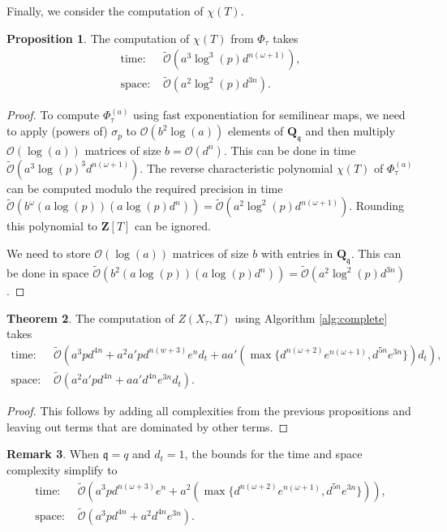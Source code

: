 \documentclass[a4paper,11pt]{article}
\numberwithin{equation}{section}
\newcommand{\ZZ}{\mathbf{Z}} %
\newcommand{\QQ}{\mathbf{Q}} %
\theoremstyle{definition}
\newtheorem{thm}{Theorem}[section]
\newtheorem{prop}[thm]{Proposition}
\newtheorem{rem}[thm]{Remark}
\begin{document}
Finally, we consider the computation of $\chi(T)$.

\begin{prop}
The computation of $\chi(T)$ from $\Phi_{\tau}$ takes
\begin{align*}
\mbox{time: }  &\tilde{\mathcal{O}}(a^3 \log^3(p) d^{n(\omega+1)}), \\
\mbox{space: } &\tilde{\mathcal{O}}(a^2 \log^2(p) d^{3n}).
\end{align*}
\end{prop}

\begin{proof}
To compute $\Phi_{\tau}^{(a)}$ using fast exponentiation for semilinear maps, we need to apply (powers of) $\sigma_p$ to $\mathcal{O}(b^2 \log(a))$
elements of $\QQ_{\mathfrak{q}}$ and then multiply $\mathcal{O}(\log(a))$ matrices of size $b=\mathcal{O}(d^n)$. This
can be done in time $\tilde{\mathcal{O}}(a^3 \log(p)^3 d^{n(\omega+1)})$. The reverse characteristic polynomial $\chi(T)$ of 
$\Phi_{\tau}^{(a)}$ can be computed modulo the required precision in time 
$\tilde{\mathcal{O}}(b^{\omega} (a \log(p))(a \log(p) d^n))= \tilde{\mathcal{O}}(a^2 \log^2(p) d^{n(\omega+1)})$. Rounding
this polynomial to $\ZZ[T]$ can be ignored.

We need to store $\mathcal{O}(\log(a))$ matrices of size $b$ with entries in $\QQ_{\mathfrak{q}}$. This can be done in
space $\tilde{\mathcal{O}}(b^2 (a \log(p))(a \log(p) d^n))= \tilde{\mathcal{O}}(a^2 \log^2(p) d^{3n})$.
\end{proof}

\begin{thm}
The computation of $Z(X_{\tau},T)$ using Algorithm \ref{alg:complete} takes
\begin{align*}
\mbox{time: }  &\tilde{\mathcal{O}}(a^3 p d^{4n} + a^2 a' p d^{n(w+3)} e^n d_t+ a a' (\max \{ d^{n(\omega+2)} e^{n(\omega+1)}, d^{5n}e^{3n} \}) d_t), \\
\mbox{space: } &\tilde{\mathcal{O}}(a^2 a' p d^{4n}+a a' d^{4n} e^{3n} d_t).
\end{align*}
\end{thm}

\begin{proof}
This follows by adding all complexities from the previous propositions and leaving out terms that are dominated by other terms.
\end{proof}

\begin{rem}
When $\mathfrak{q}=q$ and $d_t=1$, the bounds for the time and space complexity simplify to
\begin{align*}
\mbox{time: }  &\tilde{\mathcal{O}}(a^3 p d^{n( \omega+3 )} e^n + a^2 ( \max \{ d^{n( \omega+2 )} e^{n(\omega+1 )}, d^{5n}e^{3n} \} )), \\
\mbox{space: } &\tilde{\mathcal{O}}(a^3 p d^{4n}+a^2 d^{4n} e^{3n}).
\end{align*}
\end{rem}
\end{document}
